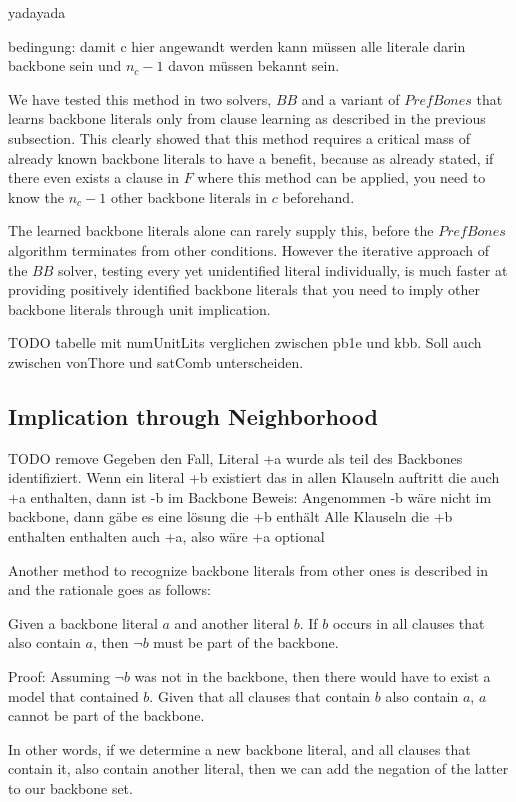 yadayada

bedingung: damit c hier angewandt werden kann müssen alle literale darin backbone sein und $n_c - 1$ davon müssen bekannt sein.


We have tested this method in two solvers, $BB$ and a variant of $PrefBones$ that learns backbone literals only from clause learning as described in the previous subsection. This clearly showed that this method requires a critical mass of already known backbone literals to have a benefit, because as already stated, if there even exists a clause in $F$ where this method can be applied, you need to know the $n_c - 1$ other backbone literals in $c$ beforehand.

The learned backbone literals alone can rarely supply this, before the $PrefBones$ algorithm terminates from other conditions. However the iterative approach of the $BB$ solver, testing every yet unidentified literal individually, is much faster at providing positively identified backbone literals that you need to imply other backbone literals through unit implication.

TODO tabelle mit numUnitLits verglichen zwischen pb1e und kbb. Soll auch zwischen vonThore und satComb unterscheiden.

\subsection{Implication through Neighborhood}

TODO remove\newline
Gegeben den Fall, Literal +a wurde als teil des Backbones identifiziert.\newline
Wenn ein literal +b existiert das in allen Klauseln auftritt die auch +a enthalten, dann ist -b im Backbone\newline
Beweis: Angenommen -b wäre nicht im backbone, dann gäbe es eine lösung die +b enthält\newline
Alle Klauseln die +b enthalten enthalten auch +a, also wäre +a optional\newline

Another method to recognize backbone literals from other ones is described in \cite{wbxcl16} and the rationale goes as follows:
\begin{lemma}
Given a backbone literal $a$ and another literal $b$. If $b$ occurs in all clauses that also contain $a$, then $\neg b$ must be part of the backbone. 

Proof: Assuming $\neg b$ was not in the backbone, then there would have to exist a model that contained $b$. Given that all clauses that contain $b$ also contain $a$, $a$ cannot be part of the backbone.
\end{lemma}

In other words, if we determine a new backbone literal, and all clauses that contain it, also contain another literal, then we can add the negation of the latter to our backbone set. 